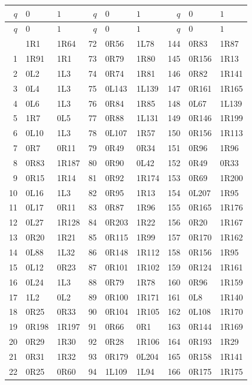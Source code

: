 \begingroup\small\setlength{\tabcolsep}{5pt}
\begin{longtable}{rll@{\quad}rll@{\quad}rll}
\toprule $q$ & $0$ & $1$ & $q$ & $0$ & $1$ & $q$ & $0$ & $1$ \\ \midrule
\endfirsthead
\toprule $q$ & $0$ & $1$ & $q$ & $0$ & $1$ & $q$ & $0$ & $1$ \\ \midrule
\endhead
\bottomrule\endfoot
0 & 1R1 & 1R64 & 72 & 0R56 & 1L78 & 144 & 0R83 & 1R87 \\
1 & 1R91 & 1R1 & 73 & 0R79 & 1R80 & 145 & 0R156 & 1R13 \\
2 & 0L2 & 1L3 & 74 & 0R74 & 1R81 & 146 & 0R82 & 1R141 \\
3 & 0L4 & 1L3 & 75 & 0L143 & 1L139 & 147 & 0R161 & 1R165 \\
4 & 0L6 & 1L3 & 76 & 0R84 & 1R85 & 148 & 0L67 & 1L139 \\
5 & 1R7 & 0L5 & 77 & 0R88 & 1L131 & 149 & 0R146 & 1R199 \\
6 & 0L10 & 1L3 & 78 & 0L107 & 1R57 & 150 & 0R156 & 1R113 \\
7 & 0R7 & 0R11 & 79 & 0R49 & 0R34 & 151 & 0R96 & 1R96 \\
8 & 0R83 & 1R187 & 80 & 0R90 & 0L42 & 152 & 0R49 & 0R33 \\
9 & 0R15 & 1R14 & 81 & 0R92 & 1R174 & 153 & 0R69 & 1R200 \\
10 & 0L16 & 1L3 & 82 & 0R95 & 1R13 & 154 & 0L207 & 1R95 \\
11 & 0L17 & 0R11 & 83 & 0R87 & 1R96 & 155 & 0R165 & 1R176 \\
12 & 0L27 & 1R128 & 84 & 0R203 & 1R22 & 156 & 0R20 & 1R167 \\
13 & 0R20 & 1R21 & 85 & 0R115 & 1R99 & 157 & 0R170 & 1R162 \\
14 & 0L88 & 1L32 & 86 & 0R148 & 1R112 & 158 & 0R156 & 1R95 \\
15 & 0L12 & 0R23 & 87 & 0R101 & 1R102 & 159 & 0R124 & 1R161 \\
16 & 0L24 & 1L3 & 88 & 0R79 & 1R78 & 160 & 0R96 & 1R159 \\
17 & 1L2 & 0L2 & 89 & 0R100 & 1R171 & 161 & 0L8 & 1R140 \\
18 & 0R25 & 0R33 & 90 & 0R104 & 1R105 & 162 & 0L108 & 1R170 \\
19 & 0R198 & 1R197 & 91 & 0R66 & 0R1 & 163 & 0R144 & 1R169 \\
20 & 0R29 & 1R30 & 92 & 0R28 & 1R106 & 164 & 0R193 & 1R29 \\
21 & 0R31 & 1R32 & 93 & 0R179 & 0L204 & 165 & 0R158 & 1R141 \\
22 & 0R25 & 0R60 & 94 & 1L109 & 1L94 & 166 & 0R175 & 1R175 \\

\end{longtable}
